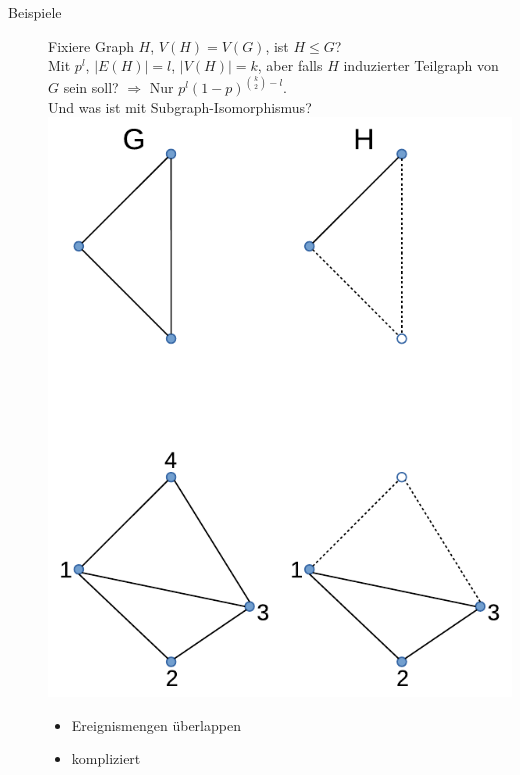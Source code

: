 \begin{description}
    \item[Beispiele] Fixiere Graph $H$, $V(H) = V(G)$, ist $H \leqslant G$? \\
        Mit $p^l$, $|E(H)| = l$, $|V(H)| = k$, aber falls $H$ induzierter Teilgraph von $G$ sein soll? $\Rightarrow$ Nur $p^l (1-p)^{\binom{k}{2} - l}$. \\
        Und was ist mit Subgraph-Isomorphismus?
        \includegraphics[scale=0.5]{lectures/161125/pix/4.pdf}
        \begin{itemize}
            \item Ereignismengen überlappen
            \item kompliziert
        \end{itemize}
\end{description}

